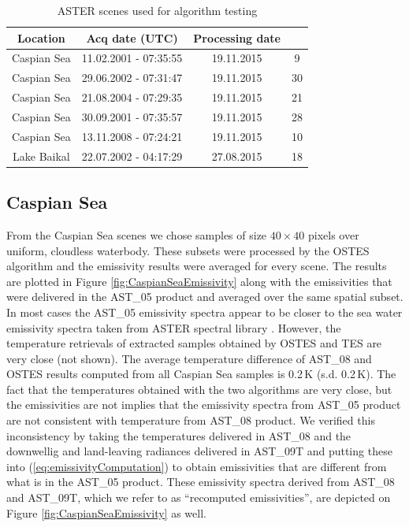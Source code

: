 \begin{table}[!t]
\vspace{0.5em}
\footnotesize
\centering
\begin{tabular}{cccc}
\toprule Location & Acq date (UTC) & Processing date & \parbox[c][1.4cm][c]{1.8cm}{} \\ \hline
Caspian Sea & 11.02.2001 - 07:35:55 & 19.11.2015 &  { 9} \\
Caspian Sea & 29.06.2002 - 07:31:47 & 19.11.2015 &  {30} \\
Caspian Sea & 21.08.2004 - 07:29:35 & 19.11.2015 &  {21} \\
Caspian Sea & 30.09.2001 - 07:35:57 & 19.11.2015 &  {28} \\
Caspian Sea & 13.11.2008 - 07:24:21 & 19.11.2015 &  {10} \\
Lake Baikal & 22.07.2002 - 04:17:29 & 27.08.2015 &  {18} \\

\bottomrule
\end{tabular}
\vspace{1.5 em}
\caption{ASTER scenes used for algorithm testing}
\label{table:ASTERScenes}
\normalsize
\end{table}

\subsection*{Caspian Sea}

From the Caspian Sea scenes we chose samples of size $40 \times 40$ pixels over uniform, cloudless waterbody. These subsets were processed by the OSTES algorithm and the emissivity results were averaged for every scene. The results are plotted in Figure \ref{fig:CaspianSeaEmissivity} along with the emissivities that were delivered in the AST\_05 product and averaged over the same spatial subset. In most cases the AST\_05 emissivity spectra appear to be closer to the sea water emissivity spectra taken from ASTER spectral library \cite{BH09}. However, the temperature retrievals of extracted samples obtained by OSTES and TES are very close (not shown). The average temperature difference of AST\_08 and OSTES results computed from all Caspian Sea samples is 0.2\,K (s.d. 0.2\,K). The fact that the temperatures obtained with the two algorithms are very close, but the emissivities are not implies that the emissivity spectra from AST\_05 product are not consistent with temperature from AST\_08 product. We verified this inconsistency by taking the temperatures delivered in AST\_08 and the downwellig and land-leaving radiances delivered in AST\_09T and putting these into (\ref{eq:emissivityComputation}) to obtain emissivities that are different from what is in the AST\_05 product. These emissivity spectra derived from AST\_08 and AST\_09T, which we refer to as ``recomputed emissivities'', are depicted on Figure \ref{fig:CaspianSeaEmissivity} as well. 

